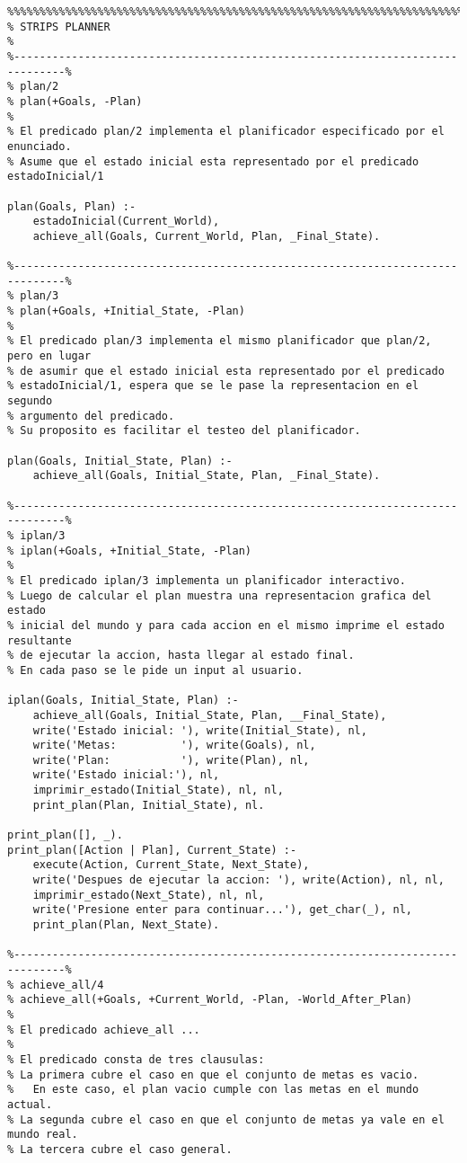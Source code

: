 \documentclass[a4paper,12pt]{report}
\begin{document}
\begin{footnotesize}
\begin{verbatim}
%%%%%%%%%%%%%%%%%%%%%%%%%%%%%%%%%%%%%%%%%%%%%%%%%%%%%%%%%%%%%%%%%%%%%%%%%%%%%%%%
% STRIPS PLANNER
%
%------------------------------------------------------------------------------%
% plan/2
% plan(+Goals, -Plan)
%
% El predicado plan/2 implementa el planificador especificado por el enunciado.
% Asume que el estado inicial esta representado por el predicado estadoInicial/1

plan(Goals, Plan) :- 
    estadoInicial(Current_World),
    achieve_all(Goals, Current_World, Plan, _Final_State).

%------------------------------------------------------------------------------%
% plan/3
% plan(+Goals, +Initial_State, -Plan)
%
% El predicado plan/3 implementa el mismo planificador que plan/2, pero en lugar
% de asumir que el estado inicial esta representado por el predicado 
% estadoInicial/1, espera que se le pase la representacion en el segundo 
% argumento del predicado.
% Su proposito es facilitar el testeo del planificador. 

plan(Goals, Initial_State, Plan) :-
    achieve_all(Goals, Initial_State, Plan, _Final_State).

%------------------------------------------------------------------------------%
% iplan/3
% iplan(+Goals, +Initial_State, -Plan)
%
% El predicado iplan/3 implementa un planificador interactivo. 
% Luego de calcular el plan muestra una representacion grafica del estado 
% inicial del mundo y para cada accion en el mismo imprime el estado resultante
% de ejecutar la accion, hasta llegar al estado final.
% En cada paso se le pide un input al usuario.

iplan(Goals, Initial_State, Plan) :-
    achieve_all(Goals, Initial_State, Plan, __Final_State),
    write('Estado inicial: '), write(Initial_State), nl,
    write('Metas:          '), write(Goals), nl,
    write('Plan:           '), write(Plan), nl,
    write('Estado inicial:'), nl,
    imprimir_estado(Initial_State), nl, nl,
    print_plan(Plan, Initial_State), nl.

print_plan([], _).
print_plan([Action | Plan], Current_State) :-
    execute(Action, Current_State, Next_State),
    write('Despues de ejecutar la accion: '), write(Action), nl, nl,
    imprimir_estado(Next_State), nl, nl,
    write('Presione enter para continuar...'), get_char(_), nl,
    print_plan(Plan, Next_State).

%------------------------------------------------------------------------------%
% achieve_all/4
% achieve_all(+Goals, +Current_World, -Plan, -World_After_Plan)
%
% El predicado achieve_all ...
%
% El predicado consta de tres clausulas: 
% La primera cubre el caso en que el conjunto de metas es vacio. 
%   En este caso, el plan vacio cumple con las metas en el mundo actual.
% La segunda cubre el caso en que el conjunto de metas ya vale en el mundo real.
% La tercera cubre el caso general.


\end{verbatim}
\end{footnotesize}
\end{document}
